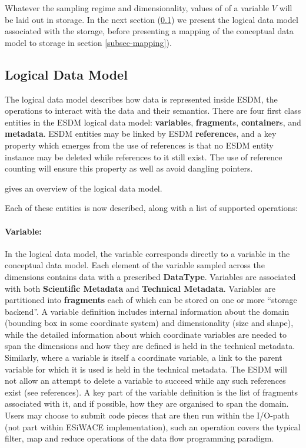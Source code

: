 Whatever the sampling regime and dimensionality, values of of a variable $V$ will be laid out in storage. In the next section (\ref{subsec-ldm}) we present the logical data model associated with the storage, before presenting a mapping of the conceptual data model to storage in section \ref{subsec-mapping}).


\subsection{Logical Data Model}
\label {subsec-ldm}

The logical data model describes how data is represented inside ESDM, the operations to interact with the data and their semantics. There are four first class entities in the ESDM logical data model: \textbf{variable}s, \textbf{fragment}s, \textbf{container}s, and \textbf{metadata}. ESDM entities may be linked by ESDM \textbf{reference}s, and a key property which emerges from the use of references is that no ESDM entity instance may be deleted while references to it still exist. The use of reference counting will ensure this property as well as avoid dangling pointers.

 gives an overview of the logical data model.



Each of these entities is now described, along with a list of supported operations:

\paragraph{Variable:} In the logical data model, the variable corresponds directly to a variable in the conceptual data model. Each element of the variable sampled across the dimensions contains data with a prescribed \textbf{DataType}.
Variables are associated with both \textbf{Scientific Metadata} and \textbf{Technical Metadata}. Variables are partitioned into \textbf{fragments} each of which can be stored on one or more ``storage backend''.
A variable definition includes internal information about the domain (bounding box in some coordinate system)  and dimensionality (size and shape), while the detailed information about which coordinate variables are needed to span the dimensions and how they are defined is held in the technical metadata.  Similarly, where a variable is itself a coordinate variable, a link to the parent variable for which it is used is held in the technical metadata.
The ESDM will not allow an attempt to delete a variable to succeed while any such references exist (see references).
A key part of the variable definition is the list of fragments associated with it, and if possible, how they are organised to span the domain.
Users may choose to submit code pieces that are then run within the I/O-path (not part within ESiWACE implementation), such an operation covers the typical filter, map and reduce operations of the data flow programming paradigm.

